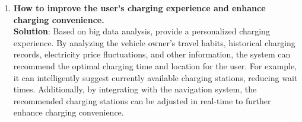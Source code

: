 \documentclass[
english,
ruledheaders=section,%
class=report,%
thesis={type=Report},%
accentcolor=9c,%
custommargins=true,%
marginpar=false,%
parskip=half-,%
fontsize=11pt,%
logofile={img/tuda_logo.pdf}, %
]{tudapub}
\begin{document}
\begin{enumerate}

        \item \textbf{How to improve the user's charging experience and enhance charging convenience.} \\
        \textbf{Solution}: Based on big data analysis, provide a personalized charging experience. By analyzing the vehicle owner's travel habits, historical charging records, electricity price fluctuations, and other information, the system can recommend the optimal charging time and location for the user. For example, it can intelligently suggest currently available charging stations, reducing wait times. Additionally, by integrating with the navigation system, the recommended charging stations can be adjusted in real-time to further enhance charging convenience.


    \end{enumerate}

\end{document}
